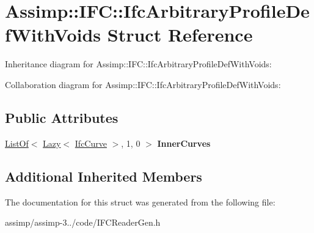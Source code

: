 \hypertarget{struct_assimp_1_1_i_f_c_1_1_ifc_arbitrary_profile_def_with_voids}{\section{Assimp\+:\+:I\+F\+C\+:\+:Ifc\+Arbitrary\+Profile\+Def\+With\+Voids Struct Reference}
\label{struct_assimp_1_1_i_f_c_1_1_ifc_arbitrary_profile_def_with_voids}
}


Inheritance diagram for Assimp\+:\+:I\+F\+C\+:\+:Ifc\+Arbitrary\+Profile\+Def\+With\+Voids\+:


Collaboration diagram for Assimp\+:\+:I\+F\+C\+:\+:Ifc\+Arbitrary\+Profile\+Def\+With\+Voids\+:
\subsection*{Public Attributes}
\begin{DoxyCompactItemize}
\item 
\hypertarget{struct_assimp_1_1_i_f_c_1_1_ifc_arbitrary_profile_def_with_voids_a28d2270dd7d2f97e446f6e548bf1762e}{\hyperlink{struct_assimp_1_1_s_t_e_p_1_1_list_of}{List\+Of}$<$ \hyperlink{struct_assimp_1_1_s_t_e_p_1_1_lazy}{Lazy}$<$ \hyperlink{struct_assimp_1_1_i_f_c_1_1_ifc_curve}{Ifc\+Curve} $>$, 1, 0 $>$ {\bfseries Inner\+Curves}}\label{struct_assimp_1_1_i_f_c_1_1_ifc_arbitrary_profile_def_with_voids_a28d2270dd7d2f97e446f6e548bf1762e}

\end{DoxyCompactItemize}
\subsection*{Additional Inherited Members}


The documentation for this struct was generated from the following file\+:\begin{DoxyCompactItemize}
\item 
assimp/assimp-\/3../code/I\+F\+C\+Reader\+Gen.\+h\end{DoxyCompactItemize}
